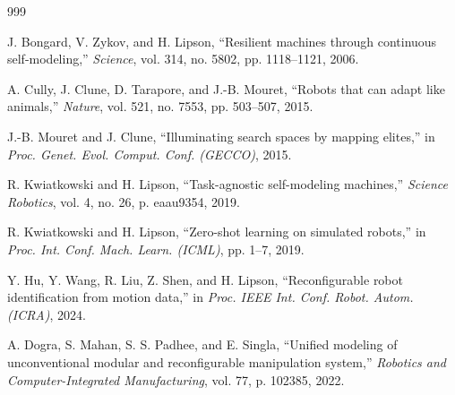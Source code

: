 \documentclass[12pt,a4paper,oneside]{report}
\begin{document}

\begin{thebibliography}{999}





J. Bongard, V. Zykov, and H. Lipson, ``Resilient machines through continuous self-modeling,'' \textit{Science}, vol. 314, no. 5802, pp. 1118--1121, 2006.




A. Cully, J. Clune, D. Tarapore, and J.-B. Mouret, ``Robots that can adapt like animals,'' \textit{Nature}, vol. 521, no. 7553, pp. 503--507, 2015.




J.-B. Mouret and J. Clune, ``Illuminating search spaces by mapping elites,'' in \textit{Proc. Genet. Evol. Comput. Conf. (GECCO)}, 2015.




R. Kwiatkowski and H. Lipson, ``Task-agnostic self-modeling machines,'' \textit{Science Robotics}, vol. 4, no. 26, p. eaau9354, 2019.




R. Kwiatkowski and H. Lipson, ``Zero-shot learning on simulated robots,'' in \textit{Proc. Int. Conf. Mach. Learn. (ICML)}, pp. 1--7, 2019.




Y. Hu, Y. Wang, R. Liu, Z. Shen, and H. Lipson, ``Reconfigurable robot identification from motion data,'' in \textit{Proc. IEEE Int. Conf. Robot. Autom. (ICRA)}, 2024.




A. Dogra, S. Mahan, S. S. Padhee, and E. Singla, ``Unified modeling of unconventional modular and reconfigurable manipulation system,'' \textit{Robotics and Computer-Integrated Manufacturing}, vol. 77, p. 102385, 2022.





\end{thebibliography}
\end{document}
